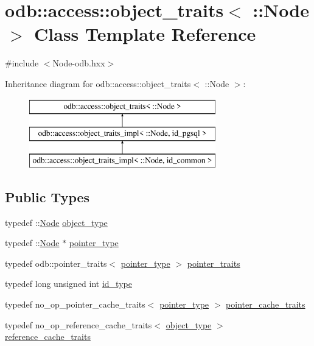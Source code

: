 \hypertarget{classodb_1_1access_1_1object__traits_3_01_1_1_node_01_4}{}\section{odb\+:\+:access\+:\+:object\+\_\+traits$<$ \+:\+:Node $>$ Class Template Reference}
\label{classodb_1_1access_1_1object__traits_3_01_1_1_node_01_4}


{\ttfamily \#include $<$Node-\/odb.\+hxx$>$}

Inheritance diagram for odb\+:\+:access\+:\+:object\+\_\+traits$<$ \+:\+:Node $>$\+:\begin{figure}[H]
\begin{center}
\leavevmode
\includegraphics[height=3.000000cm]{dc/d48/classodb_1_1access_1_1object__traits_3_01_1_1_node_01_4}
\end{center}
\end{figure}
\subsection*{Public Types}
\begin{DoxyCompactItemize}
\item 
typedef \+::\hyperlink{class_node}{Node} \hyperlink{classodb_1_1access_1_1object__traits_3_01_1_1_node_01_4_a3e752d47556347fa6f6aed44cf92c0aa}{object\+\_\+type}
\item 
typedef \+::\hyperlink{class_node}{Node} $\ast$ \hyperlink{classodb_1_1access_1_1object__traits_3_01_1_1_node_01_4_aa20d42b33b05f5d915cdc49dad07b8ad}{pointer\+\_\+type}
\item 
typedef odb\+::pointer\+\_\+traits$<$ \hyperlink{classodb_1_1access_1_1object__traits_3_01_1_1_node_01_4_aa20d42b33b05f5d915cdc49dad07b8ad}{pointer\+\_\+type} $>$ \hyperlink{classodb_1_1access_1_1object__traits_3_01_1_1_node_01_4_a98d8e6a44132407a0e45c0fcaf2251f3}{pointer\+\_\+traits}
\item 
typedef long unsigned int \hyperlink{classodb_1_1access_1_1object__traits_3_01_1_1_node_01_4_a62a1ef0fcb47c58a93a40300f7b22eb4}{id\+\_\+type}
\item 
typedef no\+\_\+op\+\_\+pointer\+\_\+cache\+\_\+traits$<$ \hyperlink{classodb_1_1access_1_1object__traits_3_01_1_1_node_01_4_aa20d42b33b05f5d915cdc49dad07b8ad}{pointer\+\_\+type} $>$ \hyperlink{classodb_1_1access_1_1object__traits_3_01_1_1_node_01_4_a5d03f23b663036c96d06a056e0c3831c}{pointer\+\_\+cache\+\_\+traits}
\item 
typedef no\+\_\+op\+\_\+reference\+\_\+cache\+\_\+traits$<$ \hyperlink{classodb_1_1access_1_1object__traits_3_01_1_1_node_01_4_a3e752d47556347fa6f6aed44cf92c0aa}{object\+\_\+type} $>$ \hyperlink{classodb_1_1access_1_1object__traits_3_01_1_1_node_01_4_af76272870045278b993f0e8805aa95b8}{reference\+\_\+cache\+\_\+traits}
\end{DoxyCompactItemize}
